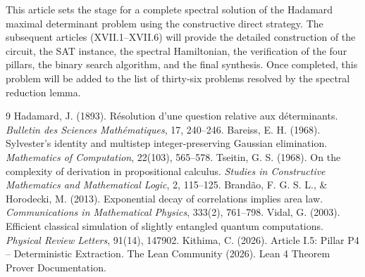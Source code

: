 \documentclass[11pt,a4paper]{article}
\begin{document}
This article sets the stage for a complete spectral solution of the Hadamard maximal determinant problem using the constructive direct strategy. The subsequent articles (XVII.1–XVII.6) will provide the detailed construction of the circuit, the SAT instance, the spectral Hamiltonian, the verification of the four pillars, the binary search algorithm, and the final synthesis. Once completed, this problem will be added to the list of thirty‑six problems resolved by the spectral reduction lemma.


\begin{thebibliography}{9}
  Hadamard, J. (1893). Résolution d'une question relative aux déterminants. \emph{Bulletin des Sciences Mathématiques}, 17, 240–246.
  Bareiss, E. H. (1968). Sylvester's identity and multistep integer‑preserving Gaussian elimination. \emph{Mathematics of Computation}, 22(103), 565–578.
  Tseitin, G. S. (1968). On the complexity of derivation in propositional calculus. \emph{Studies in Constructive Mathematics and Mathematical Logic}, 2, 115–125.
  Brandão, F. G. S. L., \& Horodecki, M. (2013). Exponential decay of correlations implies area law. \emph{Communications in Mathematical Physics}, 333(2), 761–798.
  Vidal, G. (2003). Efficient classical simulation of slightly entangled quantum computations. \emph{Physical Review Letters}, 91(14), 147902.
  Kithima, C. (2026). Article I.5: Pillar P4 – Deterministic Extraction.
  The Lean Community (2026). Lean 4 Theorem Prover Documentation.
\end{thebibliography}
\end{document}
